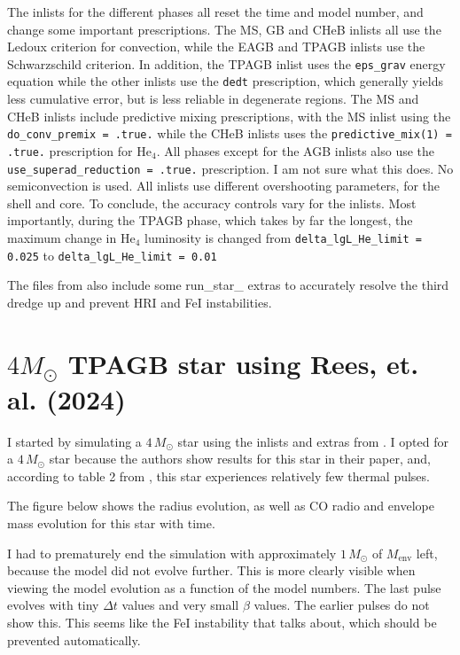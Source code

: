 \documentclass[a4paper,10pt]{article}
\begin{document}
The inlists for the different phases all reset the time and model number, and change some important prescriptions. The MS, GB and CHeB inlists all use the Ledoux criterion for convection, while the EAGB and TPAGB inlists use the Schwarzschild criterion. 
In addition, the TPAGB inlist uses the \lstinline[style=output, breaklines=true]|eps_grav| energy equation while the other inlists use the \lstinline[style=output, breaklines=true]|dedt| prescription, which generally yields less cumulative error, but is less reliable in degenerate regions.
The MS and CHeB inlists include predictive mixing prescriptions, with the MS inlist using the \lstinline[style=output, breaklines=true]|do_conv_premix = .true.| while the CHeB inlists uses the \lstinline[style=output, breaklines=true]|predictive_mix(1) = .true.| prescription for He\(_4\).
All phases except for the AGB inlists also use the \lstinline[style=output, breaklines=true]|use_superad_reduction = .true.| prescription. I am not sure what this does.
No semiconvection is used.
All inlists use different overshooting parameters, for the shell and core.
To conclude, the accuracy controls vary for the inlists. Most importantly, during the TPAGB phase, which takes by far the longest, the maximum change in He\(_4\) luminosity is changed from \lstinline[style=output, breaklines=true]|delta_lgL_He_limit = 0.025| to \lstinline[style=output, breaklines=true]|delta_lgL_He_limit = 0.01|

The files from \citet{rees2024a} also include some run\_star\_ extras to accurately resolve the third dredge up and prevent HRI and FeI instabilities.

\newpage
\section{\texorpdfstring{$4 M_\odot $}{4 solar mass} TPAGB star using Rees, et. al. (2024)}
I started by simulating a \(4\,M_\odot \) star using the inlists and extras from \citet{rees2024a}. I opted for a \(4\,M_\odot \) star because the authors show results for this star in their paper, and, according to table 2 from \citet{rees2024b}, this star experiences relatively few thermal pulses.

The figure below shows the radius evolution, as well as CO radio and envelope mass evolution for this star with time.
\begin{figure}[ht]
    \centering
\end{figure}

I had to prematurely end the simulation with approximately \(1\,M_\odot \) of \(M_\text{env}\) left, because the model did not evolve further.
This is more clearly visible when viewing the model evolution as a function of the model numbers.
The last pulse evolves with tiny \(\Delta t\) values and very small \(\beta \) values.
The earlier pulses do not show this.
This seems like the FeI instability that \citet{rees2024b} talks about, which should be prevented automatically.
\end{document}

